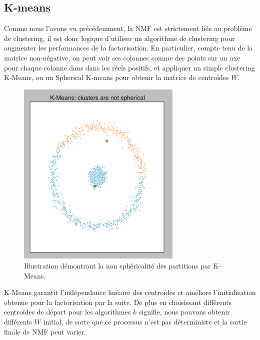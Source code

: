 \documentclass[runningheads]{llncs}
\begin{document}
\subsection{K-means}
Comme nous l'avons vu précédemment, la NMF est strictement liée au problème de clustering, il est donc logique d'utiliser un algorithme de clustering pour augmenter les performances de la factorisation. En particulier, compte tenu de la matrice non-négative, on peut voir ses colonnes comme des points sur un axe pour chaque colonne dans dans les réels positifs, et appliquer un simple clustering K-Means, ou un Spherical K-means pour obtenir la matrice de centroïdes $W$. 

\begin{figure}[H]
\centering
\includegraphics[width=0.7\textwidth]{k_means_not_spherical.png}
\caption{Illustration démontrant la non sphéricalité des partitions par K-Means.}
  \label{fig:k_means_not_spherical}
\end{figure}
K-Means garantit l'indépendance linéaire des centroïdes et améliore l'initialisation obtenue pour la factorisation par la suite. De plus en choisissant différents centroïdes de départ pour les algorithmes $k$ signifie, nous pouvons obtenir différents $W$ initial, de sorte que ce processus n'est pas déterministe et la sortie finale de NMF peut varier.
\end{document}

